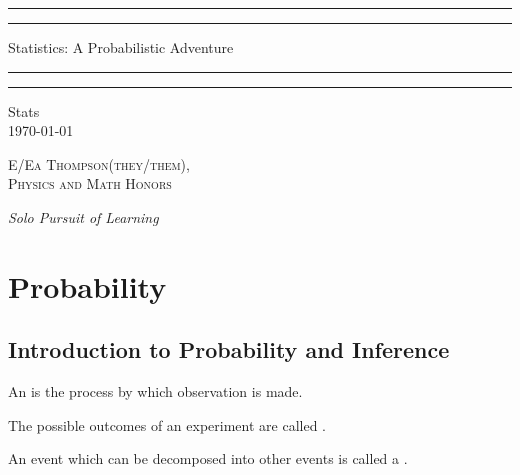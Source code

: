 \documentclass[12pt, a4paper, twoside, openright, titlepage]{book}
\begin{document}

\begin{titlepage}
    \centering
    \scshape
    \vspace*{\baselineskip}
    \rule{\textwidth}{1.6pt}\vspace*{-\baselineskip}\vspace*{2pt}
    \rule{\textwidth}{0.4pt}
    
    \vspace{0.75\baselineskip}
    
    {\LARGE Statistics: A Probabilistic Adventure}
    
    \vspace{0.75\baselineskip}
    
    \rule{\textwidth}{0.4pt}\vspace*{-\baselineskip}\vspace{3.2pt}
    \rule{\textwidth}{1.6pt}
    
    \vspace{2\baselineskip}
    Stats \\
    \vspace*{3\baselineskip}
    \monthdayyeardate\today \\
    \vspace*{5.0\baselineskip}
    
    {\scshape\Large E/Ea Thompson(they/them), \\ Physics and Math Honors\\}
    
    \vspace{1.0\baselineskip}
    \textit{Solo Pursuit of Learning}
\end{titlepage}

\tableofcontents


\chapter{Probability}

\section{\textsection Introduction to Probability and Inference}

\begin{defn}{}{}
    An  is the process by which observation is made.
\end{defn}

\begin{defn}{}{}
    The possible outcomes of an experiment are called .

    An event which can be decomposed into other events is called a .
\end{defn}
\end{document}
